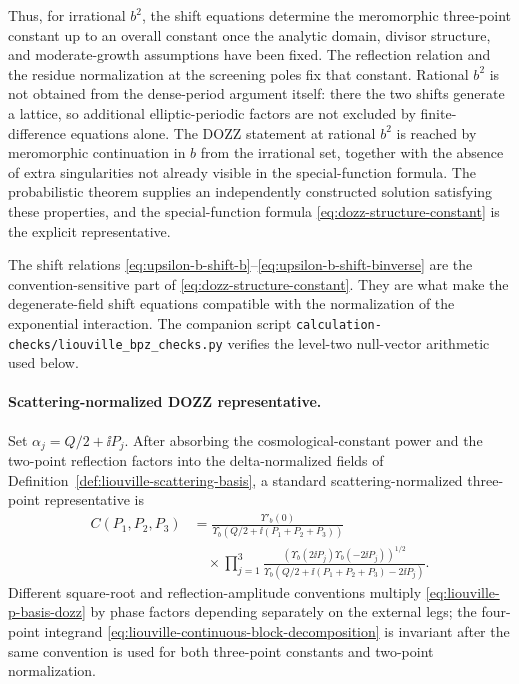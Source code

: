 Thus, for irrational \(b^2\), the shift equations determine the meromorphic
three-point constant up to an overall constant once the analytic domain,
divisor structure, and moderate-growth assumptions have been fixed.  The
reflection relation and the residue normalization at the screening poles fix
that constant.  Rational \(b^2\) is not obtained from the dense-period
argument itself: there the two shifts generate a lattice, so additional
elliptic-periodic factors are not excluded by finite-difference equations
alone.  The DOZZ statement at rational \(b^2\) is reached by meromorphic
continuation in \(b\) from the irrational set, together with the absence of
extra singularities not already visible in the special-function formula.  The
probabilistic theorem supplies an independently constructed solution
satisfying these properties, and the special-function formula
\eqref{eq:dozz-structure-constant} is the explicit representative.

The shift relations \eqref{eq:upsilon-b-shift-b}--\eqref{eq:upsilon-b-shift-binverse}
are the convention-sensitive part of \eqref{eq:dozz-structure-constant}.  They
are what make the degenerate-field shift equations compatible with the
normalization of the exponential interaction.  The companion script
\texttt{calculation-checks/liouville\_bpz\_checks.py} verifies the level-two
null-vector arithmetic used below.

\paragraph{Scattering-normalized DOZZ representative.}
Set \(\alpha_j=Q/2+\ii P_j\).  After absorbing the cosmological-constant
power and the two-point reflection factors into the delta-normalized fields
of Definition~\ref{def:liouville-scattering-basis}, a standard
scattering-normalized three-point representative is
\begin{equation}
\begin{aligned}
  C(P_1,P_2,P_3)
  &=
  \frac{\Upsilon'_b(0)}
       {\Upsilon_b\!\left(Q/2+\ii(P_1+P_2+P_3)\right)}
  \\
  &\quad\times
  \prod_{j=1}^3
  \frac{
    \left(\Upsilon_b(2\ii P_j)\Upsilon_b(-2\ii P_j)\right)^{1/2}
  }{
    \Upsilon_b\!\left(
      Q/2+\ii(P_1+P_2+P_3)-2\ii P_j
    \right)
  } .
\end{aligned}
  \label{eq:liouville-p-basis-dozz}
\end{equation}
Different square-root and reflection-amplitude conventions multiply
\eqref{eq:liouville-p-basis-dozz} by phase factors depending separately on
the external legs; the four-point integrand
\eqref{eq:liouville-continuous-block-decomposition} is invariant after the
same convention is used for both three-point constants and two-point
normalization.

